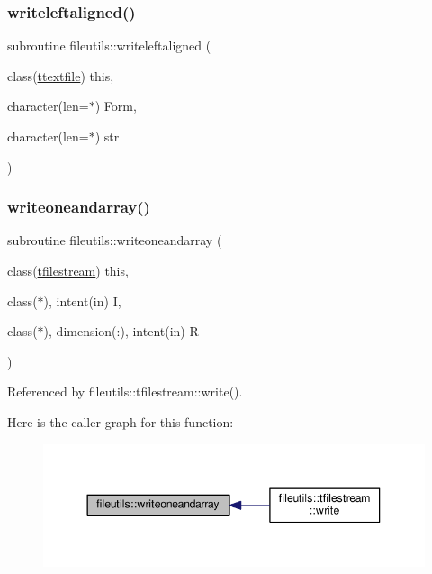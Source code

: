 \mbox{\label{namespacefileutils_a4db10f3a8145e0e4d26416a1718a0c13}} 
\subsubsection{\texorpdfstring{writeleftaligned()}{writeleftaligned()}}
{\footnotesize\ttfamily subroutine fileutils\+::writeleftaligned (\begin{DoxyParamCaption}\item[{class(\mbox{\hyperlink{structfileutils_1_1ttextfile}{ttextfile}})}]{this,  }\item[{character(len=$\ast$)}]{Form,  }\item[{character(len=$\ast$)}]{str }\end{DoxyParamCaption})\hspace{0.3cm}{\ttfamily [private]}}

\mbox{\label{namespacefileutils_adf43b426efd6b01f81b673d3db3cd8d8}} 
\subsubsection{\texorpdfstring{writeoneandarray()}{writeoneandarray()}}
{\footnotesize\ttfamily subroutine fileutils\+::writeoneandarray (\begin{DoxyParamCaption}\item[{class(\mbox{\hyperlink{structfileutils_1_1tfilestream}{tfilestream}})}]{this,  }\item[{class($\ast$), intent(in)}]{I,  }\item[{class($\ast$), dimension(\+:), intent(in)}]{R }\end{DoxyParamCaption})\hspace{0.3cm}{\ttfamily [private]}}



Referenced by fileutils\+::tfilestream\+::write().

Here is the caller graph for this function\+:
\nopagebreak
\begin{figure}[H]
\begin{center}
\leavevmode
\includegraphics[width=344pt]{namespacefileutils_adf43b426efd6b01f81b673d3db3cd8d8_icgraph}
\end{center}
\end{figure}
\mbox{\label{namespacefileutils_a416e6d6a5f7a1dfc3da764788ecaac59}} 
